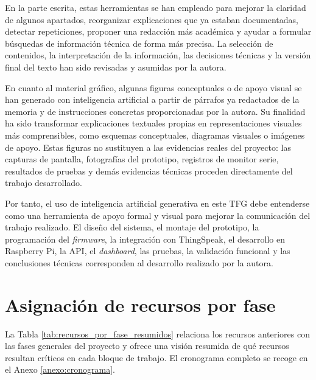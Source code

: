 En la parte escrita, estas herramientas se han empleado para mejorar la claridad de algunos apartados, reorganizar explicaciones que ya estaban documentadas, detectar repeticiones, proponer una redacción más académica y ayudar a formular búsquedas de información técnica de forma más precisa. La selección de contenidos, la interpretación de la información, las decisiones técnicas y la versión final del texto han sido revisadas y asumidas por la autora.

En cuanto al material gráfico, algunas figuras conceptuales o de apoyo visual se han generado con inteligencia artificial a partir de párrafos ya redactados de la memoria y de instrucciones concretas proporcionadas por la autora. Su finalidad ha sido transformar explicaciones textuales propias en representaciones visuales más comprensibles, como esquemas conceptuales, diagramas visuales o imágenes de apoyo. Estas figuras no sustituyen a las evidencias reales del proyecto: las capturas de pantalla, fotografías del prototipo, registros de monitor serie, resultados de pruebas y demás evidencias técnicas proceden directamente del trabajo desarrollado.

Por tanto, el uso de inteligencia artificial generativa en este TFG debe entenderse como una herramienta de apoyo formal y visual para mejorar la comunicación del trabajo realizado. El diseño del sistema, el montaje del prototipo, la programación del \textit{firmware}, la integración con ThingSpeak, el desarrollo en Raspberry Pi, la API, el \textit{dashboard}, las pruebas, la validación funcional y las conclusiones técnicas corresponden al desarrollo realizado por la autora.

\section{Asignación de recursos por fase}

La Tabla \ref{tab:recursos_por_fase_resumidos} relaciona los recursos anteriores con las fases generales del proyecto y ofrece una visión resumida de qué recursos resultan críticos en cada bloque de trabajo. El cronograma completo se recoge en el Anexo \ref{anexo:cronograma}.

